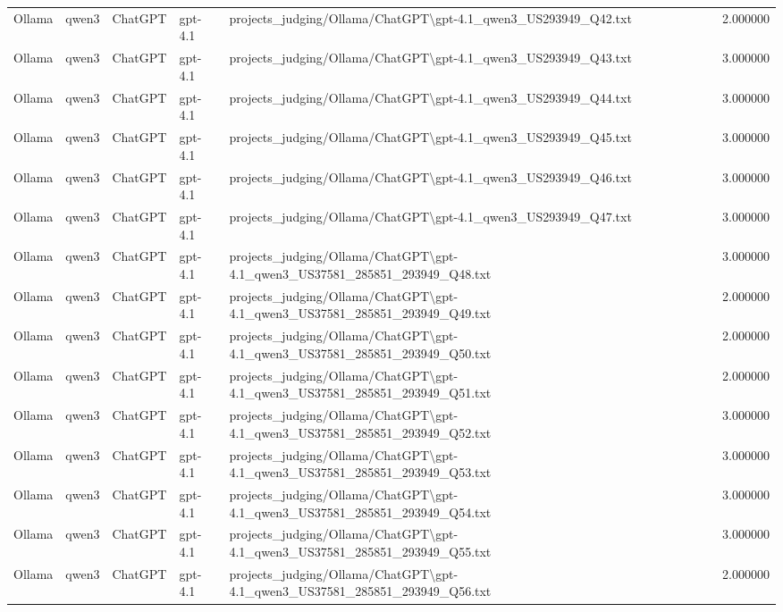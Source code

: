 \begin{table}[H]
\begin{tabular}{lllllr}
Ollama & qwen3 & ChatGPT & gpt-4.1 & projects\_judging/Ollama/ChatGPT\textbackslash gpt-4.1\_qwen3\_US293949\_Q42.txt & 2.000000 \\
Ollama & qwen3 & ChatGPT & gpt-4.1 & projects\_judging/Ollama/ChatGPT\textbackslash gpt-4.1\_qwen3\_US293949\_Q43.txt & 3.000000 \\
Ollama & qwen3 & ChatGPT & gpt-4.1 & projects\_judging/Ollama/ChatGPT\textbackslash gpt-4.1\_qwen3\_US293949\_Q44.txt & 3.000000 \\
Ollama & qwen3 & ChatGPT & gpt-4.1 & projects\_judging/Ollama/ChatGPT\textbackslash gpt-4.1\_qwen3\_US293949\_Q45.txt & 3.000000 \\
Ollama & qwen3 & ChatGPT & gpt-4.1 & projects\_judging/Ollama/ChatGPT\textbackslash gpt-4.1\_qwen3\_US293949\_Q46.txt & 3.000000 \\
Ollama & qwen3 & ChatGPT & gpt-4.1 & projects\_judging/Ollama/ChatGPT\textbackslash gpt-4.1\_qwen3\_US293949\_Q47.txt & 3.000000 \\
Ollama & qwen3 & ChatGPT & gpt-4.1 & projects\_judging/Ollama/ChatGPT\textbackslash gpt-4.1\_qwen3\_US37581\_285851\_293949\_Q48.txt & 3.000000 \\
Ollama & qwen3 & ChatGPT & gpt-4.1 & projects\_judging/Ollama/ChatGPT\textbackslash gpt-4.1\_qwen3\_US37581\_285851\_293949\_Q49.txt & 2.000000 \\
Ollama & qwen3 & ChatGPT & gpt-4.1 & projects\_judging/Ollama/ChatGPT\textbackslash gpt-4.1\_qwen3\_US37581\_285851\_293949\_Q50.txt & 2.000000 \\
Ollama & qwen3 & ChatGPT & gpt-4.1 & projects\_judging/Ollama/ChatGPT\textbackslash gpt-4.1\_qwen3\_US37581\_285851\_293949\_Q51.txt & 2.000000 \\
Ollama & qwen3 & ChatGPT & gpt-4.1 & projects\_judging/Ollama/ChatGPT\textbackslash gpt-4.1\_qwen3\_US37581\_285851\_293949\_Q52.txt & 3.000000 \\
Ollama & qwen3 & ChatGPT & gpt-4.1 & projects\_judging/Ollama/ChatGPT\textbackslash gpt-4.1\_qwen3\_US37581\_285851\_293949\_Q53.txt & 3.000000 \\
Ollama & qwen3 & ChatGPT & gpt-4.1 & projects\_judging/Ollama/ChatGPT\textbackslash gpt-4.1\_qwen3\_US37581\_285851\_293949\_Q54.txt & 3.000000 \\
Ollama & qwen3 & ChatGPT & gpt-4.1 & projects\_judging/Ollama/ChatGPT\textbackslash gpt-4.1\_qwen3\_US37581\_285851\_293949\_Q55.txt & 3.000000 \\
Ollama & qwen3 & ChatGPT & gpt-4.1 & projects\_judging/Ollama/ChatGPT\textbackslash gpt-4.1\_qwen3\_US37581\_285851\_293949\_Q56.txt & 2.000000 \\

\end{tabular}
\end{table}
